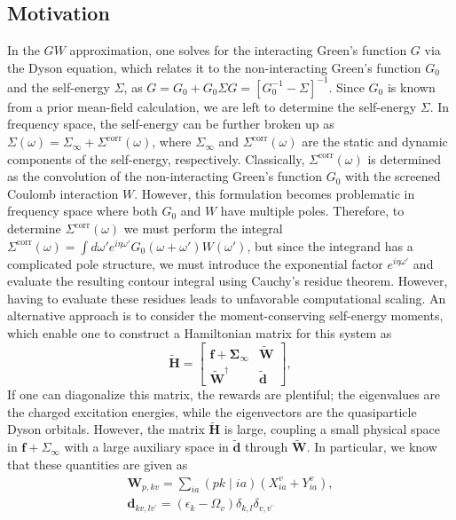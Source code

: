 \documentclass[12pt]{article} %
\begin{document}
\subsection{Motivation}
In the $GW$ approximation, one solves for the interacting Green's function $G$ via the Dyson equation, which relates it to the non-interacting Green's function $G_0$ and the self-energy $\Sigma$, as $G=G_0+G_0\Sigma G=\left[G_0^{-1}-\Sigma\right]^{-1}$. Since $G_0$ is known from a prior mean-field calculation, we are left to determine the self-energy $\Sigma$. In frequency space, the self-energy can be further broken up as $\Sigma(\omega)=\Sigma_{\infty}+\Sigma^{\text{corr}}(\omega)$, where $\Sigma_{\infty}$ and $\Sigma^{\text{corr}}(\omega)$ are the static and dynamic components of the self-energy, respectively. Classically, $\Sigma^{\text{corr}}(\omega)$ is determined as the convolution of the non-interacting Green's function $G_0$ with the screened Coulomb interaction $W$. However, this formulation becomes problematic in frequency space where both $G_0$ and $W$ have multiple poles. Therefore, to determine $\Sigma^{\text{corr}}(\omega)$ we must perform the integral $\Sigma^{\text{corr}}(\omega)=\int d\omega' e^{i\eta \omega'} G_0(\omega + \omega')W(\omega')$, but since the integrand has a complicated pole structure, we must introduce the exponential factor $e^{i\eta \omega'}$ and evaluate the resulting contour integral using Cauchy's residue theorem. However, having to evaluate these residues leads to unfavorable computational scaling. An alternative approach is to consider the moment-conserving self-energy moments, which enable one to construct a Hamiltonian matrix for this system as 
\begin{equation}
    \tilde{\mathbf{H}}=\left[\begin{array}{cc}
\mathbf{f}+\boldsymbol{\Sigma}_{\infty} & \tilde{\mathbf{W}} \\
\tilde{\mathbf{W}}^{\dagger} & \tilde{\mathbf{d}}
\end{array}\right],
\end{equation}
If one can diagonalize this matrix, the rewards are plentiful; the eigenvalues are the charged excitation energies, while the eigenvectors are the quasiparticle Dyson orbitals. However, the matrix $\tilde{\mathbf{H}}$ is large, coupling a small physical space in $\mathbf{f}+\Sigma_{\infty}$ with a large auxiliary space in $\tilde{\mathbf{d}}$ through $\tilde{\mathbf{W}}$. In particular, we know that these quantities are given as
\begin{gather}
\mathbf{W}_{p, k v}=\sum_{i a}(p k \mid i a)\left(X_{i a}^{v}+Y_{i a}^{v}\right),  \\
\mathbf{d}_{k v, l v^{\prime}}=\left(\epsilon_{k}-\Omega_{v}\right) \delta_{k, l} \delta_{v, v^{\prime}}
\end{gather}
\end{document}
